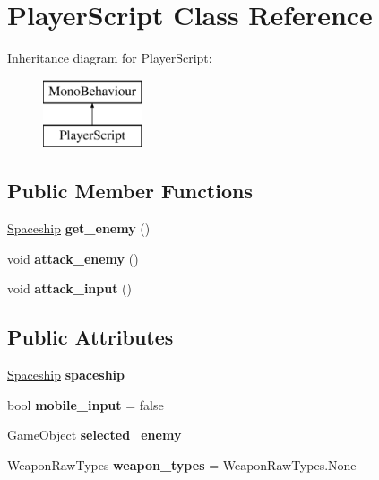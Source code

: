 \hypertarget{class_player_script}{}\section{Player\+Script Class Reference}
\label{class_player_script}
Inheritance diagram for Player\+Script\+:\begin{figure}[H]
\begin{center}
\leavevmode
\includegraphics[height=2.000000cm]{class_player_script}
\end{center}
\end{figure}
\subsection*{Public Member Functions}
\begin{DoxyCompactItemize}
\item 
\mbox{\label{class_player_script_a8376bbed9a07f2d4596b747a20bf56f4}} 
\hyperlink{class_spaceship}{Spaceship} {\bfseries get\+\_\+enemy} ()
\item 
\mbox{\label{class_player_script_a238dd91e487e0402feedc419e6476904}} 
void {\bfseries attack\+\_\+enemy} ()
\item 
\mbox{\label{class_player_script_a318bf10363985f6fbd6566d04534353e}} 
void {\bfseries attack\+\_\+input} ()
\end{DoxyCompactItemize}
\subsection*{Public Attributes}
\begin{DoxyCompactItemize}
\item 
\mbox{\label{class_player_script_a26145e1e84e3277b10d11403ac290066}} 
\hyperlink{class_spaceship}{Spaceship} {\bfseries spaceship}
\item 
\mbox{\label{class_player_script_af343886e3367dddb1565ffe8b87c4263}} 
bool {\bfseries mobile\+\_\+input} = false
\item 
\mbox{\label{class_player_script_a8c02dfebc64588743115f9906d0e2bb7}} 
Game\+Object {\bfseries selected\+\_\+enemy}
\item 
\mbox{\label{class_player_script_a610149a1f9da9199e42edd2d16d90e9e}} 
Weapon\+Raw\+Types {\bfseries weapon\+\_\+types} = Weapon\+Raw\+Types.\+None
\end{DoxyCompactItemize}

